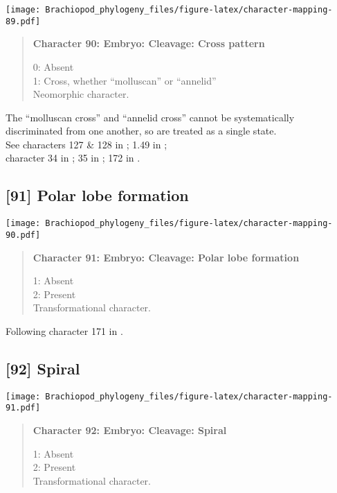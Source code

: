 \documentclass[openany]{book}
\theoremstyle{definition}
\theoremstyle{definition}
\theoremstyle{definition}
\theoremstyle{remark}
\begin{document}
\texttt{[image: Brachiopod\_phylogeny\_files/figure-latex/character-mapping-89.pdf]}

\begin{quote}
\textbf{Character 90: Embryo: Cleavage: Cross pattern}

0: Absent\\
1: Cross, whether ``molluscan'' or ``annelid''\\
Neomorphic character.
\end{quote}

The ``molluscan cross'' and ``annelid cross'' cannot be systematically
discriminated from one another, so are treated as a single state.\\
See characters 127 \& 128 in \citet{Rouse1999}; 1.49 in
\citet{SPS1996};\\
character 34 in \citet{Haszprunar1996}; 35 in \citet{Haszprunar2000};
172 in \citet{Giribet2002}.

\subsection*{{[}91{]} Polar lobe formation}\label{polar-lobe-formation}

\texttt{[image: Brachiopod\_phylogeny\_files/figure-latex/character-mapping-90.pdf]}

\begin{quote}
\textbf{Character 91: Embryo: Cleavage: Polar lobe formation}

1: Absent\\
2: Present\\
Transformational character.
\end{quote}

Following character 171 in \citet{Giribet2002}.

\subsection*{{[}92{]} Spiral}\label{spiral}

\texttt{[image: Brachiopod\_phylogeny\_files/figure-latex/character-mapping-91.pdf]}

\begin{quote}
\textbf{Character 92: Embryo: Cleavage: Spiral}

1: Absent\\
2: Present\\
Transformational character.
\end{quote}
\end{document}
